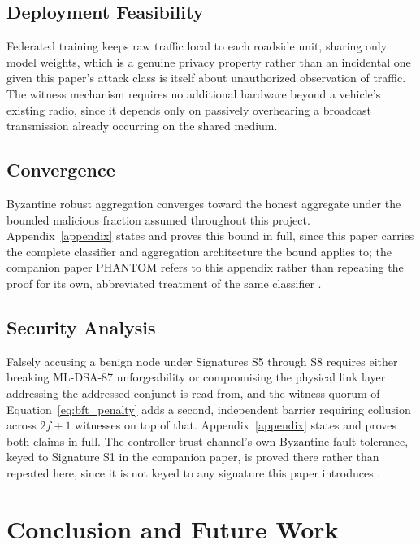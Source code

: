\documentclass[final,5p,twocolumn]{elsarticle}
\theoremstyle{remark}
\theoremstyle{plain}
\begin{document}
\subsection{Deployment Feasibility}
Federated training keeps raw traffic local to each roadside unit, sharing
only model weights, which is a genuine privacy property rather than an
incidental one given this paper's attack class is itself about unauthorized
observation of traffic. The witness mechanism requires no additional
hardware beyond a vehicle's existing radio, since it depends only on
passively overhearing a broadcast transmission already occurring on the
shared medium.

\subsection{Convergence}
Byzantine robust aggregation converges toward the honest aggregate under
the bounded malicious fraction assumed throughout this project.
Appendix~\ref{appendix} states and proves this bound in full, since this
paper carries the complete classifier and aggregation architecture the
bound applies to; the companion paper PHANTOM refers to this appendix
rather than repeating the proof for its own, abbreviated treatment of the
same classifier \cite{Phantom2026}.

\subsection{Security Analysis}
Falsely accusing a benign node under Signatures S5 through S8 requires
either breaking ML-DSA-87 unforgeability or compromising the physical link
layer addressing the addressed conjunct is read from, and the witness
quorum of Equation~\eqref{eq:bft_penalty} adds a second, independent
barrier requiring collusion across $2f{+}1$ witnesses on top of that.
Appendix~\ref{appendix} states and proves both claims in full. The
controller trust channel's own Byzantine fault tolerance, keyed to
Signature S1 in the companion paper, is proved there rather than repeated
here, since it is not keyed to any signature this paper introduces
\cite{Phantom2026}.


\section{Conclusion and Future Work}
\end{document}
